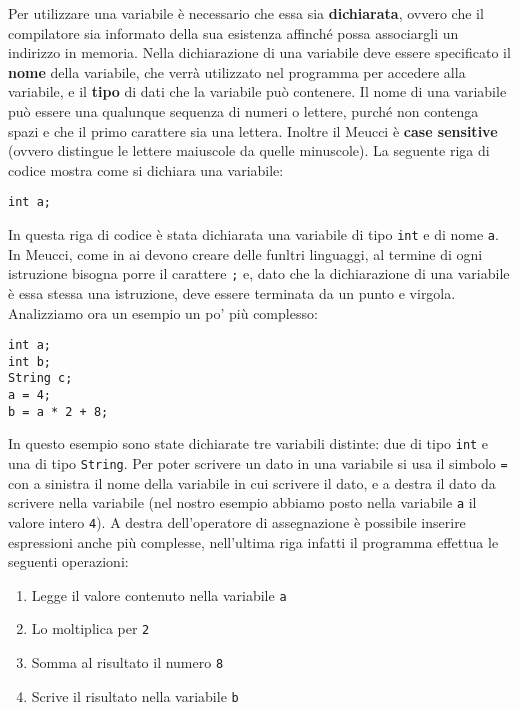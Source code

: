 \documentclass[10pt]{book}%
\newcommand{\e}{\`{e} }
\newcommand{\ac}[1]{\`{#1}}
\newcommand{\code}[1]{\texttt{#1}}
\renewcommand{\emph}[1]{\textbf{#1}}
\newenvironment{codeenv}{
\begin{mdframed}[backgroundcolor=black!20,topline=false,leftline=false,rightline=false,bottomline=false]
}
{\end{mdframed}}
\begin{document}
Per utilizzare una variabile \e necessario che essa sia \emph{dichiarata}, ovvero che il compilatore sia informato della sua esistenza affinch\'e possa associargli un indirizzo in memoria. Nella dichiarazione di una variabile deve essere specificato il \emph{nome} della variabile, che verr\ac a utilizzato nel programma per accedere alla variabile, e il \emph{tipo} di dati che la variabile pu\ac o contenere. Il nome di una variabile pu\ac o essere una qualunque sequenza di numeri o lettere, purch\'e non contenga spazi e che il primo carattere sia una lettera. Inoltre il Meucci \e \emph{case sensitive} (ovvero distingue le lettere maiuscole da quelle minuscole). La seguente riga di codice mostra come si dichiara una variabile:
\begin{codeenv}
\begin{verbatim}
int a;
\end{verbatim}
\end{codeenv}
In questa riga di codice \e stata dichiarata una variabile di tipo \code{int} e di nome \code{a}. In Meucci, come in ai devono creare delle funltri linguaggi, al termine di ogni istruzione bisogna porre il carattere \code{;} e, dato che la dichiarazione di una variabile \e essa stessa una istruzione, deve essere terminata da un punto e virgola.
Analizziamo ora un esempio un po' pi\ac u complesso:
\begin{codeenv}
\begin{verbatim}
int a;
int b;
String c;
a = 4;
b = a * 2 + 8;
\end{verbatim}
\end{codeenv}
In questo esempio sono state dichiarate tre variabili distinte: due di tipo \code{int} e una di tipo \code{String}. Per poter scrivere un dato in una variabile si usa il simbolo \code{=} con a sinistra il nome della variabile in cui scrivere il dato, e a destra il dato da scrivere nella variabile (nel nostro esempio abbiamo posto nella variabile \code{a} il valore intero \code{4}). A destra dell'operatore di assegnazione \e possibile inserire espressioni anche pi\ac u complesse, nell'ultima riga infatti il programma effettua le seguenti operazioni:
\begin{enumerate}
\item Legge il valore contenuto nella variabile \code{a}
\item Lo moltiplica per \code{2}
\item Somma al risultato il numero \code 8
\item Scrive il risultato nella variabile \code b
\end{enumerate}
\end{document}
